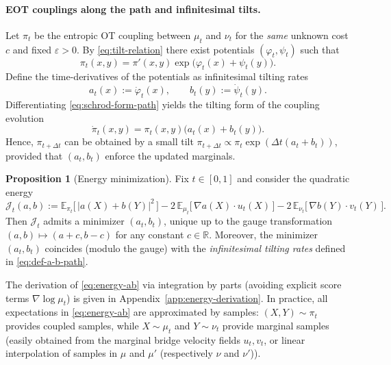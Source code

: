 \documentclass[11pt]{article}
\theoremstyle{definition}
\newtheorem{proposition}[theorem]{Proposition}
\numberwithin{equation}{section}%
\begin{document}
\paragraph{EOT couplings along the path and infinitesimal tilts.}
Let $\pi_t$ be the entropic OT coupling between $\mu_t$ and $\nu_t$ for the \textit{same} unknown cost $c$ and fixed $\varepsilon>0$. By \eqref{eq:tilt-relation} there exist potentials $(\varphi_t,\psi_t)$ such that
\begin{equation}
\label{eq:schrod-form-path}
\pi_t(x,y)= \pi'(x,y) \exp\Big(\varphi_t(x)+\psi_t(y)\Big).
\end{equation}
Define the time-derivatives of the potentials as infinitesimal tilting rates
\begin{equation}
\label{eq:def-a-b-path}
a_t(x):=\dot\varphi_t(x),
\qquad
b_t(y):=\dot\psi_t(y).
\end{equation}
Differentiating \eqref{eq:schrod-form-path} yields the tilting form of the coupling evolution
\begin{equation}
\label{eq:pi-dot}
\dot\pi_t(x,y)=\pi_t(x,y)\big(a_t(x)+b_t(y)\big).
\end{equation}
Hence, $\pi_{t+\Delta t}$ can be obtained by a small tilt
$\pi_{t+\Delta t}\propto \pi_t\exp(\Delta t(a_t+b_t))$, provided that $(a_t,b_t)$ enforce the updated marginals.

\begin{proposition}[Energy minimization]
\label{prop:energy_wellposed}
Fix $t\in[0,1]$ and consider the quadratic energy
\begin{equation}
\label{eq:energy-ab}
\mathcal J_t(a,b)
:= \mathbb{E}_{\pi_t}\!\big[\,|a(X)+b(Y)|^2\,\big]
   -2\,\mathbb{E}_{\mu_t}\!\big[\,\nabla a(X)\!\cdot\! u_t(X)\,\big]
   -2\,\mathbb{E}_{\nu_t}\!\big[\,\nabla b(Y)\!\cdot\! v_t(Y)\,\big].
\end{equation}
Then $\mathcal J_t$ admits a minimizer $(a_t,b_t)$, unique up to the gauge transformation $(a,b)\mapsto(a+c,b-c)$ for any constant $c\in\mathbb{R}$. Moreover, the minimizer $(a_t,b_t)$ coincides (modulo the gauge) with the \textit{infinitesimal tilting rates} defined in \eqref{eq:def-a-b-path}.
\end{proposition}

The derivation of \eqref{eq:energy-ab} via integration by parts (avoiding explicit score terms $\nabla\log\mu_t$) is given in Appendix~\ref{app:energy-derivation}.
In practice, all expectations in \eqref{eq:energy-ab} are approximated by samples: $(X,Y)\sim\pi_t$ provides coupled samples, while $X\sim\mu_t$ and $Y\sim\nu_t$ provide marginal samples (easily obtained from the marginal bridge velocity fields $u_t,v_t$, or linear interpolation of samples in $\mu$ and $\mu'$ (respectively $\nu$ and $\nu'$)).
\end{document}
